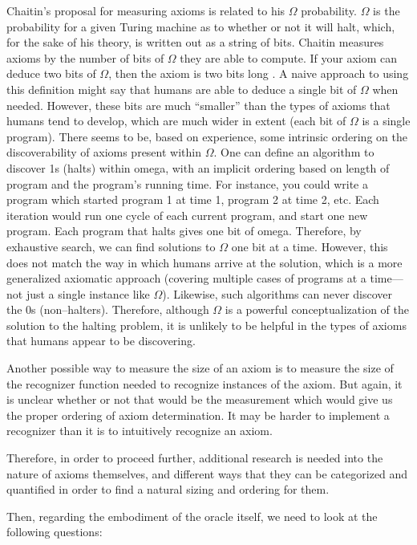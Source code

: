 Chaitin's proposal for measuring axioms is related to his $\Omega$ probability.  $\Omega$ is the probability for a given Turing machine as to whether or not it will halt, which, for the sake of his theory, is written out as a string of bits.  Chaitin measures axioms by the number of bits of $\Omega$ they are able to compute.  If your axiom can deduce two bits of $\Omega$, then the axiom is two bits long \citep{chaitin2007}.  A naive approach to using this definition might say that humans are able to deduce a single bit of $\Omega$ when needed.  However, these bits are much ``smaller'' than the types of axioms that humans tend to develop, which are much wider in extent (each bit of $\Omega$ is a single program). There seems to be, based on experience, some intrinsic ordering on the discoverability of axioms present within $\Omega$.  One can define an algorithm to discover 1s (halts) within omega, with an implicit ordering based on length of program and the program's running time.  For instance, you could write a program which started program 1 at time 1, program 2 at time 2, etc.  Each iteration would run one cycle of each current program, and start one new program.  Each program that halts gives one bit of omega.  Therefore, by exhaustive search, we can find solutions to $\Omega$ one bit at a time.  However, this does not match the way in which humans arrive at the solution, which is a more generalized axiomatic approach (covering multiple cases of programs at a time---not just a single instance like $\Omega$).  Likewise, such algorithms can never discover the 0s (non--halters).   Therefore, although $\Omega$ is a powerful conceptualization of the solution to the halting problem, it is unlikely to be helpful in the types of axioms that humans appear to be discovering.

Another possible way to measure the size of an axiom is to measure the size of the recognizer function needed to recognize instances of the axiom.  But again, it is unclear whether or not that would be the measurement which would give us the proper ordering of axiom determination.  It may be harder to implement a recognizer than it is to intuitively recognize an axiom. 

Therefore, in order to proceed further, additional research is needed into the nature of axioms themselves, and different ways that they can be categorized and quantified in order to find a natural sizing and ordering for them.

Then, regarding the embodiment of the oracle itself, we need to look at the following questions:

